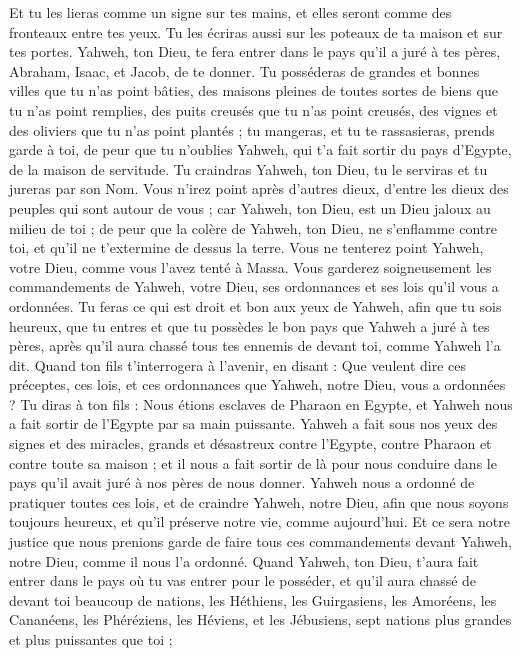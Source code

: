 \begin{multicols}{2}
Et tu les lieras comme un signe sur tes mains, et elles seront comme des fronteaux entre tes yeux.
Tu les écriras aussi sur les poteaux de ta maison et sur tes portes.
Yahweh, ton Dieu, te fera entrer dans le pays qu'il a juré à tes pères, Abraham, Isaac, et Jacob, de te donner. Tu posséderas de grandes et bonnes villes que tu n'as point bâties,
des maisons pleines de toutes sortes de biens que tu n'as point remplies, des puits creusés que tu n'as point creusés, des vignes et des oliviers que tu n'as point plantés ; tu mangeras, et tu te rassasieras,
prends garde à toi, de peur que tu n'oublies Yahweh, qui t'a fait sortir du pays d'Egypte, de la maison de servitude.
Tu craindras Yahweh, ton Dieu, tu le serviras et tu jureras par son Nom.
Vous n’irez point après d’autres dieux, d'entre les dieux des peuples qui sont autour de vous ;
car Yahweh, ton Dieu, est un Dieu jaloux au milieu de toi ; de peur que la colère de Yahweh, ton Dieu, ne s'enflamme contre toi, et qu'il ne t'extermine de dessus la terre.
Vous ne tenterez point Yahweh, votre Dieu, comme vous l'avez tenté à Massa.
Vous garderez soigneusement les commandements de Yahweh, votre Dieu, ses ordonnances et ses lois qu'il vous a ordonnées.
Tu feras ce qui est droit et bon aux yeux de Yahweh, afin que tu sois heureux, que tu entres et que tu possèdes le bon pays que Yahweh a juré à tes pères,
après qu’il aura chassé tous tes ennemis de devant toi, comme Yahweh l’a dit.
Quand ton fils t'interrogera à l’avenir, en disant : Que veulent dire ces préceptes, ces lois, et ces ordonnances que Yahweh, notre Dieu, vous a ordonnées ?
Tu diras à ton fils : Nous étions esclaves de Pharaon en Egypte, et Yahweh nous a fait sortir de l'Egypte par sa main puissante.
Yahweh a fait sous nos yeux des signes et des miracles, grands et désastreux contre l’Egypte, contre Pharaon et contre toute sa maison ;
et il nous a fait sortir de là pour nous conduire dans le pays qu’il avait juré à nos pères de nous donner.
Yahweh nous a ordonné de pratiquer toutes ces lois, et de craindre Yahweh, notre Dieu, afin que nous soyons toujours heureux, et qu’il préserve notre vie, comme aujourd'hui.
Et ce sera notre justice que nous prenions garde de faire tous ces commandements devant Yahweh, notre Dieu, comme il nous l'a ordonné.
\VerseOne{}Quand Yahweh, ton Dieu, t'aura fait entrer dans le pays où tu vas entrer pour le posséder, et qu'il aura chassé de devant toi beaucoup de nations, les Héthiens, les Guirgasiens, les Amoréens, les Cananéens, les Phéréziens, les Héviens, et les Jébusiens, sept nations plus grandes et plus puissantes que toi ;

\end{multicols}
